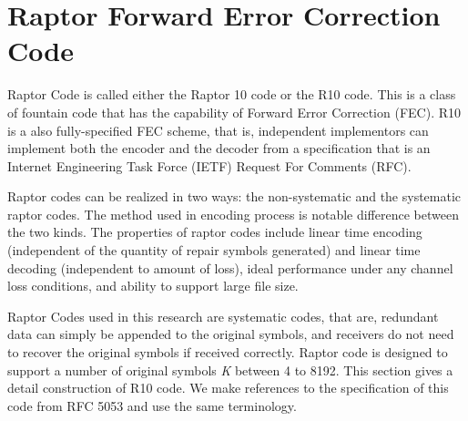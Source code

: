 \section{Raptor Forward Error Correction Code}
Raptor Code is called either the Raptor 10 code or the R10 code. This is a class of fountain code that has the capability of Forward Error Correction (FEC). R10 is a also fully-specified FEC scheme, that is, independent implementors can implement both the encoder and the decoder from a specification that is an Internet Engineering Task Force (IETF) Request For Comments (RFC). 

Raptor codes can be realized in two ways: the non-systematic and the systematic raptor codes. The method used in encoding process is notable difference between the two kinds. The properties of raptor codes include linear time encoding \cite{luby2006raptor} (independent of the quantity of repair symbols generated) and linear time decoding (independent to amount of loss), ideal performance under any channel loss conditions, and ability to support large file size.

Raptor Codes used in this research are systematic codes, that are, redundant data can simply be appended to the original symbols, and receivers do not need to recover the original symbols if received correctly. Raptor code is designed to support a number of original symbols \textit{K} between 4 to 8192. This section gives a detail construction of R10 code. We make references to the specification of this code from RFC 5053 \cite{luby2007rfc} and use the same terminology.


